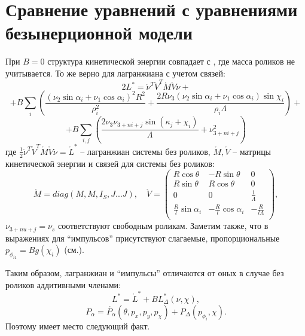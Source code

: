 \section{Сравнение уравнений с уравнениями безынерционной модели}

При $B=0$ структура кинетической энергии совпадает с  \cite{Zobova2011}, где масса роликов не учитывается. То же верно для лагранжиана с учетом связей:
$$ 2L^{*} = \mathring{\nu}^T \mathring{V}^T \mathring{M} \mathring{V} \mathring{\nu} + $$
$$ + B\sum_{i}(
	\frac{(\nu_2\sin\alpha_i+\nu_1\cos\alpha_i)^2R^2}
	{\rho_i^2} +
	\frac{2R\nu_3(\nu_2\sin\alpha_i+\nu_1\cos\alpha_i)\sin\chi_i}
	{\rho_i\Lambda}
) + $$
$$+ B\sum_{i,j}(
	\frac{2\nu_3\nu_{3+ni+j}\sin(\kappa_j+\chi_i)}
	{\Lambda}
	+
	\nu_{3+ni+j}^2
)
$$
где $\frac{1}{2}\mathring{\nu}^T \mathring{V}^T \mathring{M} \mathring{V} \mathring{\nu} = \mathring{L}^{*}$ -- лагранжиан системы без роликов, $\mathring{M}, \mathring{V}$ -- матрицы кинетической энергии и связей для системы без роликов:
$$
\mathring{M} = diag(M, M, I_S, J...J),
\quad
\mathring{V} = \left(\begin{matrix}
    R\cos\theta & -R\sin\theta & 0 \\
    R\sin\theta & R\cos\theta  & 0 \\
    0           & 0            & \frac{1}{\Lambda} \\
    \frac{R}{l}\sin\alpha_i & -\frac{R}{l}\cos\alpha_i & -\frac{R}{l\Lambda} \\
\end{matrix}\right),
$$
$\nu_{3+nu+j} = \nu_s$ соответствуют свободным роликам. Заметим также, что в выражениях для ``импульсов'' присутствуют слагаемые, пропорциональные $p_{\phi_{i1}} = Bg(\chi_{i})$ (см.).

Таким образом, лагранжиан и ``импульсы'' отличаются от оных в случае без роликов аддитивными членами:
$$ L^{*} = \mathring{L}^{*} + BL^{*}_\Delta(\nu, \chi),$$
$$ P_\alpha = \mathring{P_\alpha}(\theta, p_x, p_y, p_\chi) + P_\Delta(p_{\phi_i}, \chi).$$
Поэтому имеет место следующий факт.

